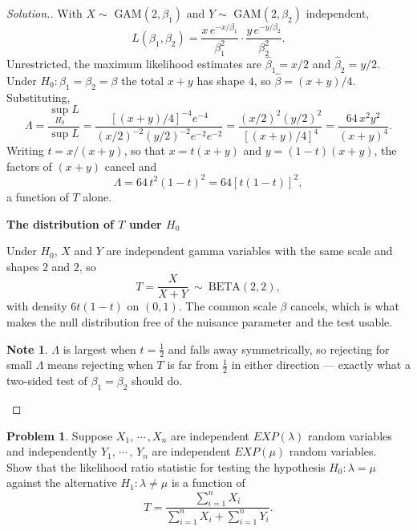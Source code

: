 \documentclass[12pt,a4paper]{report}
\theoremstyle{definition}
\newtheorem*{note}{Note}
\newcommand{\subhead}[1]{%
  \par\medskip\noindent\textbf{#1}\par\nobreak\smallskip}
\newtheorem{problemx}{Problem}[section]
\newenvironment{problem}{\begin{problemx}}{\end{problemx}}
\newenvironment{solution}
  {\renewcommand{\qedsymbol}{}\begin{proof}[\textit{Solution}.]}
  {\end{proof}}
\begin{document}
\begin{solution}
With $X\sim$ GAM$(2,\beta_1)$ and $Y\sim$ GAM$(2,\beta_2)$ independent,
\[L(\beta_1,\beta_2) = \frac{x\,e^{-x/\beta_1}}{\beta_1^{2}}\cdot
\frac{y\,e^{-y/\beta_2}}{\beta_2^{2}} .\]
Unrestricted, the maximum likelihood estimates are
$\widehat{\beta}_1 = x/2$ and $\widehat{\beta}_2 = y/2$. Under
$H_0:\beta_1=\beta_2=\beta$ the total $x+y$ has shape $4$, so
$\widehat{\beta} = (x+y)/4$. Substituting,
\[\Lambda = \frac{\sup_{H_0}L}{\sup L}
= \frac{\left[(x+y)/4\right]^{-4}e^{-4}}
       {\left(x/2\right)^{-2}\left(y/2\right)^{-2}e^{-2}e^{-2}}
= \frac{\left(x/2\right)^{2}\left(y/2\right)^{2}}{\left[(x+y)/4\right]^{4}}
= \frac{64\,x^{2}y^{2}}{(x+y)^{4}} .\]
Writing $t = x/(x+y)$, so that $x=t(x+y)$ and $y=(1-t)(x+y)$, the factors of
$(x+y)$ cancel and
\[\Lambda = 64\,t^{2}(1-t)^{2} = 64\left[t(1-t)\right]^{2},\]
a function of $T$ alone.

\subhead{The distribution of $T$ under $H_0$}
Under $H_0$, $X$ and $Y$ are independent gamma variables with the same scale and
shapes $2$ and $2$, so
\[T = \frac{X}{X+Y} \ \sim\ \text{BETA}(2,2),\]
with density $6t(1-t)$ on $(0,1)$. The common scale $\beta$ cancels, which is
what makes the null distribution free of the nuisance parameter and the test
usable.

\begin{note}
$\Lambda$ is largest when $t=\tfrac12$ and falls away symmetrically, so rejecting
for small $\Lambda$ means rejecting when $T$ is far from $\tfrac12$ in either
direction --- exactly what a two-sided test of $\beta_1=\beta_2$ should do.
\end{note}
\end{solution}

\begin{problem}
Suppose $X_1, \, \cdots\, , X_n$ are independent $EXP(\lambda)$ random variables and independently $Y_1, \, \cdots\, , \, Y_n$  are independent $EXP(\mu)$ random variables.\\
Show that the likelihood ratio statistic for testing the hypothesis $H_0: \lambda = \mu$ against the alternative $H_1: \lambda \neq \mu$ is  a function of 
\[T = \frac{\sum^n_{i = 1} X_i}{\sum^n_{i =1} X_i + \sum^n_{i = 1} Y_i}.\]
\end{problem}
\end{document}
